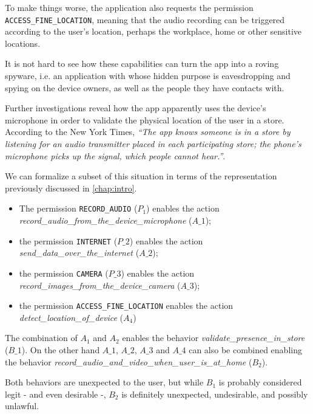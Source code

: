 To make things worse, the application also requests the permission \texttt{ACCESS\_FINE\_LOCATION}, meaning that the audio recording can be triggered according to the user's location, perhaps the workplace, home or other sensitive locations.

It is not hard to see how these capabilities can turn the app into a roving spyware, i.e. an application with whose hidden purpose is eavesdropping and spying on the device owners, as well as the people they have contacts with.

Further investigations reveal how the app apparently uses the device's microphone in order to validate the physical location of the user in a store. According to the New York Times, \emph{``The app knows someone is in a store by listening for an audio transmitter placed in each participating store; the phone's microphone picks up the signal, which people cannot hear.''}\cite{shopkick-nyt}.

We can formalize a subset of this situation in terms of the representation previously discussed in \autoref{chap:intro}.
\begin{itemize}
    \item The permission \texttt{RECORD\_AUDIO} ($P_1$) enables the action \\ \emph{record\_audio\_from\_the\_device\_microphone} ($A\_1$);
    \item the permission \texttt{INTERNET} ($P\_2$) enables the action \\ \emph{send\_data\_over\_the\_internet} ($A\_2$);
    \item the permission \texttt{CAMERA} ($P\_3$) enables the action \\ \emph{record\_images\_from\_the\_device\_camera} ($A\_3$);
    \item the permission \texttt{ACCESS\_FINE\_LOCATION} enables the action \\ \emph{detect\_location\_of\_device} ($A_4$)
\end{itemize}

The combination of $A_1$ and $A_2$ enables the behavior \emph{validate\_presence\_in\_store} ($B\_1$). On the other hand $A\_1$, $A\_2$, $A\_3$ and $A\_4$ can also be combined enabling the behavior \emph{record\_audio\_and\_video\_when\_user\_is\_at\_home} ($B_2$).

Both behaviors are unexpected to the user, but while $B_1$ is probably considered legit - and even desirable -, $B_2$ is definitely unexpected, undesirable, and possibly unlawful.

